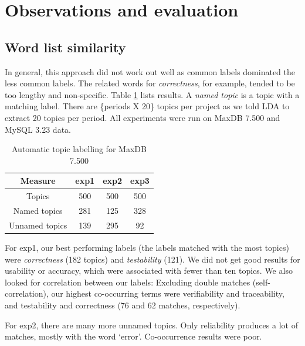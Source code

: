 \documentclass{acm_proc_article-sp}
\newcommand{\XXX}[1]{\textcolor{red}{{\it \textbf{[XXX: #1]}}}}
\begin{document}
\section{Observations and evaluation}

\subsection{Word list similarity}


In general, this approach did not work out well as common labels dominated the less common labels. The related words for \emph{correctness}, for example, tended to be too lengthy and non-specific. Table \ref{tbl:wordlist} lists results. A \emph{named   topic} is a topic with a matching label. There are \{periods X 20\} topics per project as we told LDA to extract 20 topics per period. All experiments were run on MaxDB 7.500 and MySQL 3.23 data.

\begin{table}
	\centering
\begin{tabular}{c|c|c|c}
\toprule
Measure &		 \textsf{exp1} &	 \textsf{exp2} &	 \textsf{exp3} \\
\midrule
Topics &			500		 &			500  	 & 		500  \\
Named topics &		281      &			125      &		328  \\
Unnamed topics &	139      &			295      &      92   \\
\bottomrule
\end{tabular}
	\caption{Automatic topic labelling for MaxDB 7.500}
	\label{tbl:wordlist}

\end{table}


For \textsf{exp1}, our best performing labels (the labels matched with the most topics) were \emph{correctness} (182 topics) and \emph{testability} (121). We did not get good results for usability or accuracy, which were associated with fewer than ten topics. We also looked for correlation between our labels: Excluding double matches (self-correlation), our highest co-occurring terms were verifiability and traceability, and testability and correctness (76 and 62 matches, respectively).

For \textsf{exp2}, there are many more unnamed topics. Only reliability produces a lot of matches, mostly with the word `error'. Co-occurrence results were poor.
\end{document}
